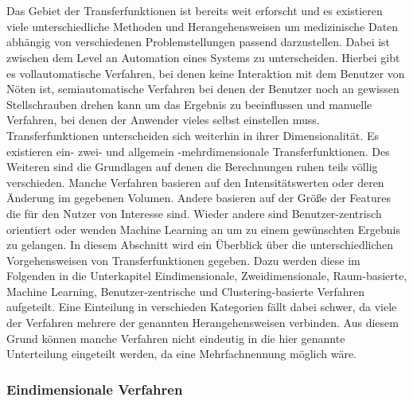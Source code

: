 \chapter{}
\label{sec:state_of_the_art}






Das Gebiet der Transferfunktionen ist bereits weit erforscht und es existieren viele unterschiedliche Methoden und Herangehensweisen um medizinische Daten abhängig von verschiedenen Problemstellungen passend darzustellen.
\newline
Dabei ist zwischen dem Level an Automation eines Systems zu unterscheiden. Hierbei gibt es vollautomatische Verfahren, bei denen keine Interaktion mit dem Benutzer von Nöten ist, semiautomatische Verfahren bei denen der Benutzer noch an gewissen Stellschrauben drehen kann um das Ergebnis zu beeinflussen und manuelle Verfahren, bei denen der Anwender vieles selbst einstellen muss. Transferfunktionen unterscheiden sich weiterhin in ihrer Dimensionalität. Es existieren ein- zwei- und allgemein -mehrdimensionale Transferfunktionen.
Des Weiteren sind die Grundlagen auf denen die Berechnungen ruhen teils völlig verschieden. Manche Verfahren basieren auf den Intensitätswerten oder deren Änderung im gegebenen Volumen. Andere basieren auf der Größe der Features die für den Nutzer von Interesse sind. Wieder andere sind Benutzer-zentrisch orientiert oder wenden Machine Learning an um zu einem gewünschten Ergebnis zu gelangen.
\newline
In diesem Abschnitt wird ein Überblick über die unterschiedlichen Vorgehensweisen von Transferfunktionen gegeben. Dazu werden diese im Folgenden in die Unterkapitel Eindimensionale, Zweidimensionale, Raum-basierte, Machine Learning, Benutzer-zentrische und Clustering-basierte Verfahren aufgeteilt.
Eine Einteilung in verschieden Kategorien fällt dabei schwer, da viele der Verfahren mehrere der genannten Herangehensweisen verbinden. Aus diesem Grund können manche Verfahren nicht eindeutig in die hier genannte Unterteilung eingeteilt werden, da eine Mehrfachnennung möglich wäre.


\subsection{Eindimensionale Verfahren}

